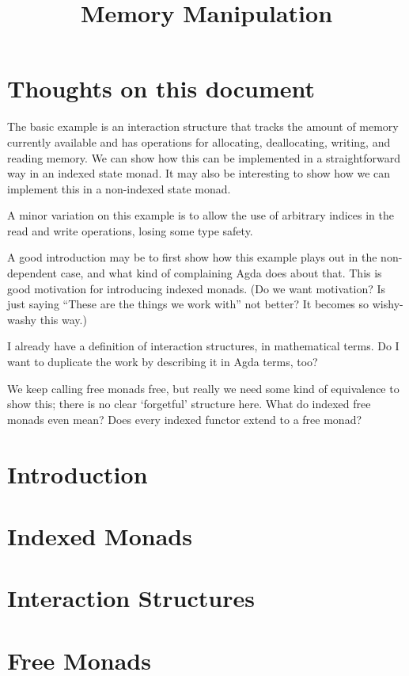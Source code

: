 \documentclass{article}
\title{\vspace{-2cm}Memory Manipulation}
\theoremstyle{definition}
\begin{document}
    \maketitle

    \section*{Thoughts on this document}

    The basic example is an interaction structure that tracks the amount of memory currently available and has
    operations for allocating, deallocating, writing, and reading memory.  We can show how this can be implemented in a
    straightforward way in an indexed state monad.  It may also be interesting to show how we can implement this in a
    non-indexed state monad.

    A minor variation on this example is to allow the use of arbitrary indices in the read and write operations, losing
    some type safety.

    A good introduction may be to first show how this example plays out in the non-dependent case, and what kind of
    complaining Agda does about that.  This is good motivation for introducing indexed monads.  (Do we want motivation?
    Is just saying ``These are the things we work with'' not better?  It becomes so wishy-washy this way.)

    I already have a definition of interaction structures, in mathematical terms.  Do I want to duplicate the work by
    describing it in Agda terms, too?

    We keep calling free monads free, but really we need some kind of equivalence to show this; there is no clear
    `forgetful' structure here.  What do indexed free monads even mean?  Does every indexed functor extend to a free
    monad?

    \section{Introduction}

    \section{Indexed Monads}

    \section{Interaction Structures}

    \section{Free Monads}
\end{document}
